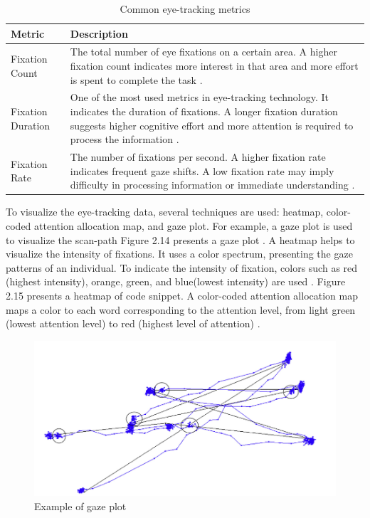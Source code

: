 \begin{table}[H]
\centering
\small %
\caption{Common eye-tracking metrics}
\label{tab:eye_tracking_metrics}
\begin{tabular}{p{} | p{}}
\hline
\rule{0pt}{1.2em}\textbf{Metric} & \textbf{Description} \\[0.5em]
\hline
\rule{0pt}{1.2em}Fixation Count & The total number of eye fixations on a certain area. A higher fixation count indicates more interest in that area and more effort is spent to complete the task \cite{obaidellah2018survey}. \\[0.5em]
\hline
\rule{0pt}{1.2em}Fixation Duration & One of the most used metrics in eye-tracking technology. It indicates the duration of fixations. A longer fixation duration suggests higher cognitive effort and more attention is required to process the information \cite{junior5005089understanding}. \\[0.5em]
\hline
\rule{0pt}{1.2em}Fixation Rate & The number of fixations per second. A higher fixation rate indicates frequent gaze shifts. A low fixation rate may imply difficulty in processing information or immediate understanding \cite{bauer2017indentations}. \\[0.5em]
\hline
\end{tabular}
\end{table}






To visualize the eye-tracking data, several techniques are used: heatmap, color-coded attention allocation map, and gaze plot. For example, a gaze plot is used to visualize the scan-path Figure 2.14 presents a gaze plot \cite{sharafi2015systematic}. A heatmap helps to visualize the intensity of fixations. It uses a color spectrum, presenting the gaze patterns of an individual. 
To indicate the intensity of fixation, colors such as red (highest intensity), orange, green, and blue(lowest intensity) are used \cite{sharafi2015systematic}. Figure 2.15 presents a heatmap of code snippet.  A color-coded attention allocation map maps a color to each word corresponding to the attention level, from light green (lowest attention level) to red (highest level of attention) \cite{sharafi2015systematic}.


\begin{figure} [H]
  \centering
  \includegraphics[scale=0.8]{figures/gaze.png}
  \caption{Example of gaze plot \cite[p. 9]{blignaut2019visualization}}
  \label{fig:AnhangsChor}
\end{figure}


